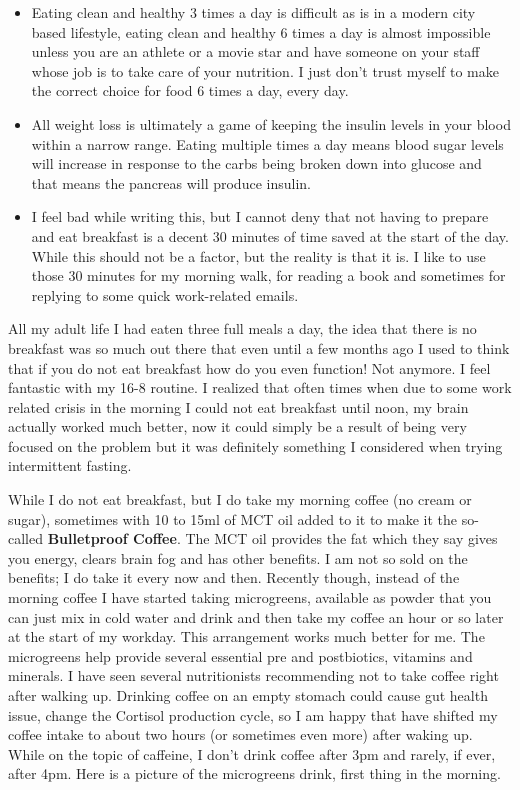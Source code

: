 \documentclass[
  oneside]{book}
\begin{document}
\begin{itemize}
\item
  Eating clean and healthy 3 times a day is difficult as is in a modern city based lifestyle, eating clean and healthy 6 times a day is almost impossible unless you are an athlete or a movie star and have someone on your staff whose job is to take care of your nutrition. I just don't trust myself to make the correct choice for food 6 times a day, every day.
\item
  All weight loss is ultimately a game of keeping the insulin levels in your blood within a narrow range. Eating multiple times a day means blood sugar levels will increase in response to the carbs being broken down into glucose and that means the pancreas will produce insulin.
\item
  I feel bad while writing this, but I cannot deny that not having to prepare and eat breakfast is a decent 30 minutes of time saved at the start of the day. While this should not be a factor, but the reality is that it is. I like to use those 30 minutes for my morning walk, for reading a book and sometimes for replying to some quick work-related emails.
\end{itemize}

All my adult life I had eaten three full meals a day, the idea that there is no breakfast was so much out there that even until a few months ago I used to think that if you do not eat breakfast how do you even function! Not anymore. I feel fantastic with my 16-8 routine. I realized that often times when due to some work related crisis in the morning I could not eat breakfast until noon, my brain actually worked much better, now it could simply be a result of being very focused on the problem but it was definitely something I considered when trying intermittent fasting.

While I do not eat breakfast, but I do take my morning coffee (no cream or sugar), sometimes with 10 to 15ml of MCT oil added to it to make it the so-called \textbf{Bulletproof Coffee}. The MCT oil provides the fat which they say gives you energy, clears brain fog and has other benefits. I am not so sold on the benefits; I do take it every now and then. Recently though, instead of the morning coffee I have started taking microgreens, available as powder that you can just mix in cold water and drink and then take my coffee an hour or so later at the start of my workday. This arrangement works much better for me. The microgreens help provide several essential pre and postbiotics, vitamins and minerals. I have seen several nutritionists recommending not to take coffee right after walking up. Drinking coffee on an empty stomach could cause gut health issue, change the Cortisol production cycle, so I am happy that have shifted my coffee intake to about two hours (or sometimes even more) after waking up. While on the topic of caffeine, I don't drink coffee after 3pm and rarely, if ever, after 4pm. Here is a picture of the microgreens drink, first thing in the morning.
\end{document}
